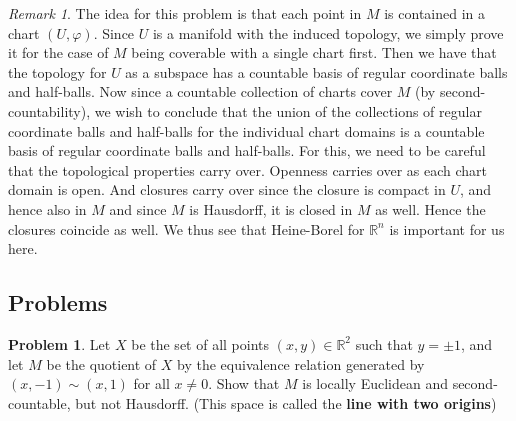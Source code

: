 \documentclass[reqno]{amsart}
\theoremstyle{plain}%
\theoremstyle{definition}
\newtheorem{problem}[theorem]{Problem}
\theoremstyle{remark}
\newtheorem*{remark}{Remark}
\begin{document}
        \begin{remark}
            The idea for this problem is that each point in
            $M$ is contained in a chart $\left( U, \varphi \right) $.
            Since $U$ is a manifold with the induced topology, 
            we simply prove it for the case of $M$ being coverable
            with a single chart first. Then we have that
            the topology for $U$ as a subspace has a countable
            basis of regular coordinate balls and half-balls.
            Now since a countable collection of charts
            cover $M$ (by second-countability), we wish to
            conclude that the union of the collections of
            regular coordinate balls and half-balls for the individual
            chart domains is a countable basis of regular coordinate
            balls and half-balls. For this, we need to be careful
            that the topological properties carry over. 
            Openness carries over as each chart domain is open.
            And closures carry over since the closure is
            compact in $U$, and hence also in $M$ and since
            $M$ is Hausdorff, it is closed in $M$ as well. 
            Hence the closures coincide as well. We thus see
            that Heine-Borel for $\mathbb{R}^{n}$ is important
            for us here.
        \end{remark}

    \subsection*{Problems}

    \begin{problem}
        Let $X$ be the set of all points
        $(x,y) \in \mathbb{R}^2$ such that
        $y = \pm 1$, and let $M$ be the quotient of
        $X$ by the equivalence relation generated
        by $\left( x,-1 \right) \sim \left( x,1 \right) $ 
        for all $x\neq 0$. Show that $M$ is locally Euclidean
        and second-countable, but not Hausdorff.
        (This space is called the \textbf{line with two
        origins})
    \end{problem}
\end{document}
